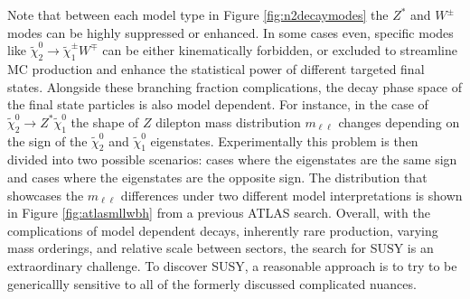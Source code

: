 Note that between each model type in Figure \ref{fig:n2decaymodes} the $Z^*$ and $W^\pm$ modes can be highly suppressed or enhanced. In some cases even, specific modes like $\tilde{\chi}^0_2\rightarrow \tilde{\chi}_1^\pm W^\mp$ can be either kinematically forbidden, or excluded to streamline MC production and enhance the statistical power of different targeted final states. Alongside these branching fraction complications, the decay phase space of the final state particles is also model dependent. For instance, in the case of $\tilde{\chi}^0_2 \rightarrow Z^*\tilde{\chi}^0_1 $ the shape of $Z$ dilepton mass distribution $m_{\ell\ell}$  changes depending on the sign of the $\tilde{\chi}_2^0$ and $\tilde{\chi}_1^0$ eigenstates. Experimentally this problem is then divided into two possible scenarios: cases where the eigenstates are the same sign and cases where the eigenstates are the opposite sign. The distribution that showcases the $m_{\ell\ell}$ differences under two different model interpretations is shown in Figure \ref{fig:atlasmllwbh} from a previous ATLAS search. Overall, with the complications of model dependent decays, inherently rare production, varying mass orderings, and relative scale between sectors, the search for SUSY is an extraordinary challenge. To discover SUSY, a reasonable approach is to try to be genericallly sensitive to all of the formerly discussed complicated nuances. 






